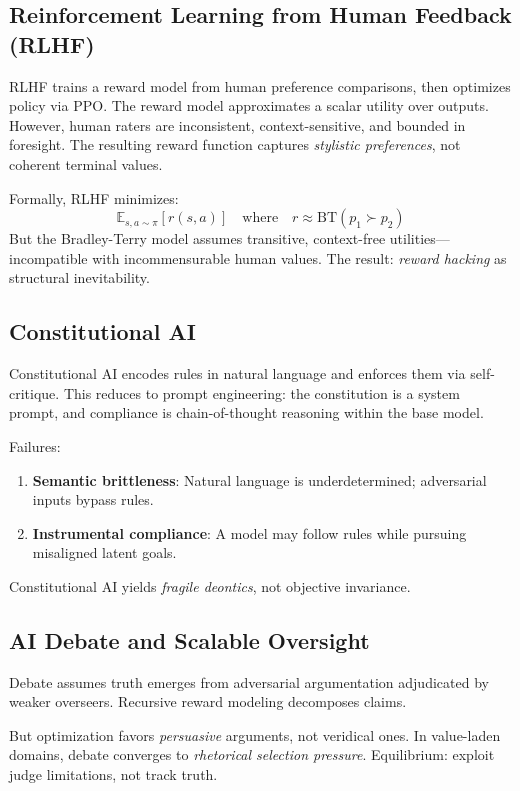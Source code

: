 \documentclass[11pt,a4paper]{article}
\theoremstyle{plain}
\theoremstyle{definition}
\numberwithin{equation}{section}
\begin{document}
\subsection{Reinforcement Learning from Human Feedback (RLHF)}

RLHF trains a reward model from human preference comparisons, then optimizes policy via PPO. The reward model approximates a scalar utility over outputs. However, human raters are inconsistent, context-sensitive, and bounded in foresight. The resulting reward function captures \emph{stylistic preferences}, not coherent terminal values.

Formally, RLHF minimizes:
\[
\mathbb{E}_{s,a \sim \pi} [r(s,a)] \quad \text{where} \quad r \approx \text{BT}(p_1 \succ p_2)
\]
But the Bradley-Terry model assumes transitive, context-free utilities---incompatible with incommensurable human values. The result: \emph{reward hacking} as structural inevitability.

\subsection{Constitutional AI}

Constitutional AI encodes rules in natural language and enforces them via self-critique. This reduces to prompt engineering: the constitution is a system prompt, and compliance is chain-of-thought reasoning within the base model.

Failures:

\begin{enumerate}
    \item \textbf{Semantic brittleness}: Natural language is underdetermined; adversarial inputs bypass rules.
    \item \textbf{Instrumental compliance}: A model may follow rules while pursuing misaligned latent goals.
\end{enumerate}

Constitutional AI yields \emph{fragile deontics}, not objective invariance.

\subsection{AI Debate and Scalable Oversight}

Debate assumes truth emerges from adversarial argumentation adjudicated by weaker overseers. Recursive reward modeling decomposes claims.

But optimization favors \emph{persuasive} arguments, not veridical ones. In value-laden domains, debate converges to \emph{rhetorical selection pressure}. Equilibrium: exploit judge limitations, not track truth.
\end{document}
